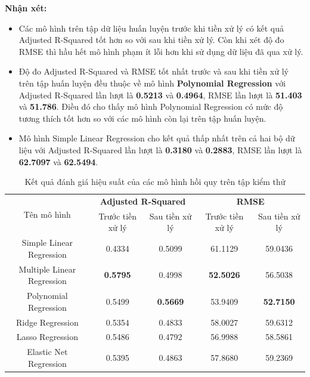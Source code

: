 \documentclass[runningheads]{llncs}
\begin{document}
\textbf{Nhận xét:} 
\begin{itemize}
	\item Các mô hình trên tập dữ liệu huấn luyện trước khi tiền xử lý có kết quả Adjusted R-Squared tốt hơn so với sau khi tiền xử lý. Còn khi xét độ đo RMSE thì hầu hết mô hình phạm ít lỗi hơn khi sử dụng dữ liệu đã qua xử lý.
	\item Độ đo Adjusted R-Squared và RMSE tốt nhất trước và sau khi tiền xử lý trên tập huấn luyện đều thuộc về mô hình \textbf{Polynomial Regression} với Adjusted R-Squared lần lượt là \textbf{0.5213} và \textbf{0.4964}, RMSE lần lượt là \textbf{51.403} và \textbf{51.786}. Điều đó cho thấy mô hình Polynomial Regression có mức độ tương thích tốt hơn so với các mô hình còn lại trên tập huấn luyện.
	\item Mô hình Simple Linear Regression cho kết quả thấp nhất trên cả hai bộ dữ liệu với Adjusted R-Squared lần lượt là \textbf{0.3180} và \textbf{0.2883}, RMSE lần lượt là \textbf{62.7097} và \textbf{62.5494}.
\end{itemize}

\begin{table}[H]
	\scriptsize
	\setlength{\tabcolsep}{0.5em}
	\renewcommand{\arraystretch}{1.5}
	\begin{center}
		\caption{Kết quả đánh giá hiệu suất của các mô hình hồi quy trên tập kiểm thử}\label{tab3}
		\begin{tabular}{|c|c|c|c|c|}
			\hline
			\multirow{2}{*}{Tên mô hình} & \multicolumn{2}{c|}{\textbf{Adjusted R-Squared}} & \multicolumn{2}{c|}{\textbf{RMSE}}\\ \cline{2-5}
										 & \multicolumn{1}{c|}{Trước tiền xử lý} & \multicolumn{1}{c|}{Sau tiền xử lý}
										 & \multicolumn{1}{c|}{Trước tiền xử lý} & \multicolumn{1}{c|}{Sau tiền xử lý}\\
			\hline
			Simple Linear Regression&0.4334&0.5099&61.1129&59.0436\\
			
			\hline
			Multiple Linear Regression&\textbf{0.5795}&0.4998&\textbf{52.5026}&56.5038\\
			
			\hline
			Polynomial Regression&0.5499&\textbf{0.5669}&53.9409&\textbf{52.7150}\\
			
			\hline
			Ridge Regression&0.5354&0.4833&58.0027&59.6312\\
			
			
			\hline
			Lasso Regression&0.5486&0.4792&56.9988&58.5861\\
			
			\hline
			Elastic Net Regression&0.5395&0.4863&57.8680&59.2369\\
			\hline
		\end{tabular}			
	\end{center}
\end{table}
\end{document}
